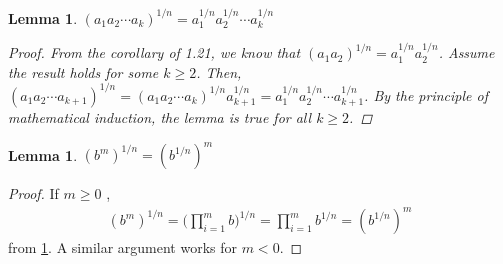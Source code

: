 \documentclass[12pt]{article}
\newtheorem{lemma}[theorem]{Lemma}
\begin{document}
\begin{lemma}
      \label{distributeRoot}
      $(a_1a_2\cdots a_k)^{1/n} = a_1^{1/n}a_2^{1/n}\cdots a_k^{1/n}$
      \begin{proof}
            From the corollary of 1.21, we know that $(a_1a_2)^{1/n} = a_1^{1/n}a_2^{1/n}$.
            Assume the result holds for some $k \ge 2$. Then, $(a_1a_2\cdots a_{k+1})^{1/n} = (a_1a_2\cdots a_{k})^{1/n}a_{k+1}^{1/n}
                  = a_1^{1/n}a_2^{1/n}\cdots a_{k+1}^{1/n}$.
            By the principle of mathematical induction, the lemma is true for all $k \ge 2$.
      \end{proof}
\end{lemma}
\begin{lemma}
      \label{revExpOrder}
      $(b^m)^{1/n} = (b^{1/n})^{m}$
\end{lemma}
\begin{proof}
      If $m\ge 0$ ,
      \begin{align*}
            (b^m)^{1/n} = \Bigg(\prod_{i = 1}^{m}b\Bigg)^{1/n} = \prod_{i = 1}^{m}b^{1/n} = (b^{1/n})^{m}
      \end{align*}
      from \ref{distributeRoot}. A similar
      argument works for $m < 0$.
\end{proof}
\end{document}
